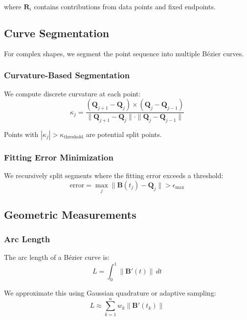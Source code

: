 \documentclass[12pt,a4paper]{article}
\begin{document}
where $\mathbf{R}_i$ contains contributions from data points and fixed endpoints.

\subsection{Curve Segmentation}

For complex shapes, we segment the point sequence into multiple Bézier curves.

\subsubsection{Curvature-Based Segmentation}

We compute discrete curvature at each point:
\begin{equation}
\kappa_j = \frac{(\mathbf{Q}_{j+1}-\mathbf{Q}_j) \times (\mathbf{Q}_j-\mathbf{Q}_{j-1})}{\|\mathbf{Q}_{j+1}-\mathbf{Q}_j\| \cdot \|\mathbf{Q}_j-\mathbf{Q}_{j-1}\|}
\end{equation}

Points with $|\kappa_j| > \kappa_{\text{threshold}}$ are potential split points.

\subsubsection{Fitting Error Minimization}

We recursively split segments where the fitting error exceeds a threshold:
\begin{equation}
\text{error} = \max_{j} \|\mathbf{B}(t_j) - \mathbf{Q}_j\| > \epsilon_{\text{max}}
\end{equation}

\subsection{Geometric Measurements}

\subsubsection{Arc Length}

The arc length of a Bézier curve is:
\begin{equation}
L = \int_0^1 \|\mathbf{B}'(t)\| \, dt
\end{equation}

We approximate this using Gaussian quadrature or adaptive sampling:
\begin{equation}
L \approx \sum_{k=1}^{n} w_k \|\mathbf{B}'(t_k)\|
\end{equation}
\end{document}
